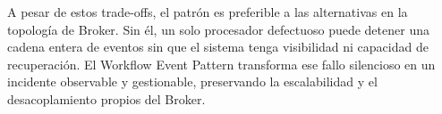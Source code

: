 A pesar de estos trade-offs, el patrón es preferible a las alternativas en la topología de Broker. Sin él, un solo procesador defectuoso puede detener una cadena entera de eventos sin que el sistema tenga visibilidad ni capacidad de recuperación. El Workflow Event Pattern transforma ese fallo silencioso en un incidente observable y gestionable, preservando la escalabilidad y el desacoplamiento propios del Broker.